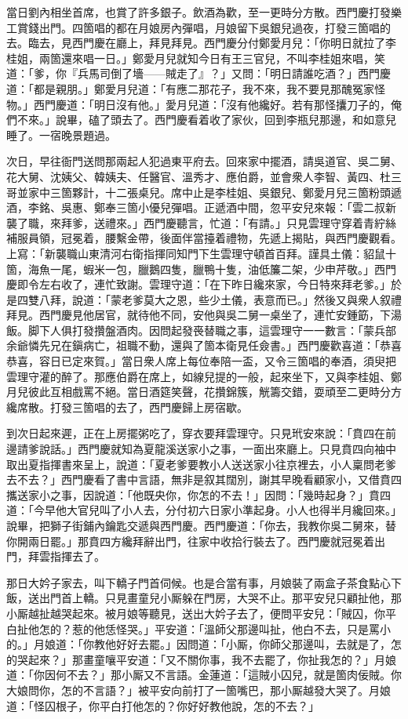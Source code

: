 當日劉內相坐首席，也賞了許多銀子。飲酒為歡，至一更時分方散。西門慶打發樂工賞錢出門。四箇唱的都在月娘房內彈唱，月娘留下吳銀兒過夜，打發三箇唱的去。臨去，見西門慶在廳上，拜見拜見。西門慶分付鄭愛月兒：「你明日就拉了李桂姐，兩箇還來唱一日。」鄭愛月兒就知今日有王三官兒，不叫李桂姐來唱，{}笑道：「爹，你『兵馬司倒了墻——賊走了』？」又問：「明日請誰吃酒？」西門慶道：「都是親朋。」鄭愛月兒道：「有應二那花子，我不來，我不要見那醜冤家怪物。」西門慶道：「明日沒有他。」愛月兒道：「沒有他纔好。若有那怪攮刀子的，俺們不來。」說畢，磕了頭去了。西門慶看着收了家伙，回到李瓶兒那邊，和如意兒睡了。一宿晚景題過。

次日，早往衙門送問那兩起人犯過東平府去。回來家中擺酒，請吳道官、吳二舅、花大舅、沈姨父、韓姨夫、任醫官、溫秀才、應伯爵，並會衆人李智、黃四、杜三哥並家中三箇夥計，十二張桌兒。席中止是李桂姐、吳銀兒、鄭愛月兒三箇粉頭遞酒，李銘、吳惠、鄭奉三箇小優兒彈唱。正遞酒中間，忽平安兒來報：「雲二叔新襲了職，來拜爹，送禮來。」西門慶聽言，忙道：「有請。」只見雲理守穿着青紵絲補服員領，冠冕着，腰繫金帶，後面伴當擡着禮物，先遞上揭貼，與西門慶觀看。上寫：「新襲職山東清河右衛指揮同知門下生雲理守頓首百拜。謹具土儀：貂鼠十箇，海魚一尾，蝦米一包，臘鵝四隻，臘鴨十隻，油低簾二架，少申芹敬。」西門慶即令左右收了，連忙致謝。雲理守道：「在下昨日纔來家，今日特來拜老爹。」於是四雙八拜，說道：「蒙老爹莫大之恩，些少土儀，表意而已。」然後又與衆人叙禮拜見。西門慶見他居官，就待他不同，安他與吳二舅一桌坐了，連忙安鍾筯，下湯飯。脚下人俱打發攢盤酒肉。因問起發䘮替職之事，這雲理守一一數言：「蒙兵部余爺憐先兄在鎭病亡，祖職不動，還與了箇本衛見任僉書。」西門慶歡喜道：「恭喜恭喜，容日已定來賀。」當日衆人席上每位奉陪一盃，又令三箇唱的奉酒，須臾把雲理守灌的醉了。那應伯爵在席上，如線兒提的一般，起來坐下，又與李桂姐、鄭月兒彼此互相戲罵不絕。當日酒筵笑聲，花攢錦簇，觥籌交錯，耍頑至二更時分方纔席散。打發三箇唱的去了，西門慶歸上房宿歇。

到次日起來遲，正在上房擺粥吃了，穿衣要拜雲理守。只見玳安來說：「賁四在前邊請爹說話。」西門慶就知為夏龍溪送家小之事，一面出來廳上。只見賁四向袖中取出夏指揮書來呈上，說道：「夏老爹要教小人送送家小往京裡去，小人稟問老爹去不去？」西門慶看了書中言語，無非是叙其闊別，謝其早晚看顧家小，又借賁四攜送家小之事，因說道：「他既央你，你怎的不去！」因問：「幾時起身？」賁四道：「今早他大官兒叫了小人去，分付初六日家小準起身。小人也得半月纔回來。」說畢，把獅子街鋪內鑰匙交遞與西門慶。西門慶道：「你去，我教你吳二舅來，替你開兩日罷。」那賁四方纔拜辭出門，往家中收拾行裝去了。西門慶就冠冕着出門，拜雲指揮去了。

那日大妗子家去，叫下轎子門首伺候。也是合當有事，月娘裝了兩盒子茶食點心下飯，送出門首上轎。只見畫童兒小厮躲在門房，大哭不止。那平安兒只顧扯他，那小厮越扯越哭起來。{}{}被月娘等聽見，送出大妗子去了，便問平安兒：「賊囚，你平白扯他怎的？惹的他恁怪哭。」平安道：「溫師父那邊叫扯，他白不去，只是罵小的。」月娘道：「你教他好好去罷。」因問道：「小厮，你師父那邊叫，去就是了，怎的哭起來？」那畫童嚷平安道：「又不關你事，我不去罷了，你扯我怎的？」月娘道：「你因何不去？」那小厮又不言語。金蓮道：「這賊小囚兒，就是箇肉佞賊。你大娘問你，怎的不言語？」被平安向前打了一箇嘴巴，{}那小厮越發大哭了。月娘道：「怪囚根子，你平白打他怎的？你好好教他說，怎的不去？」

